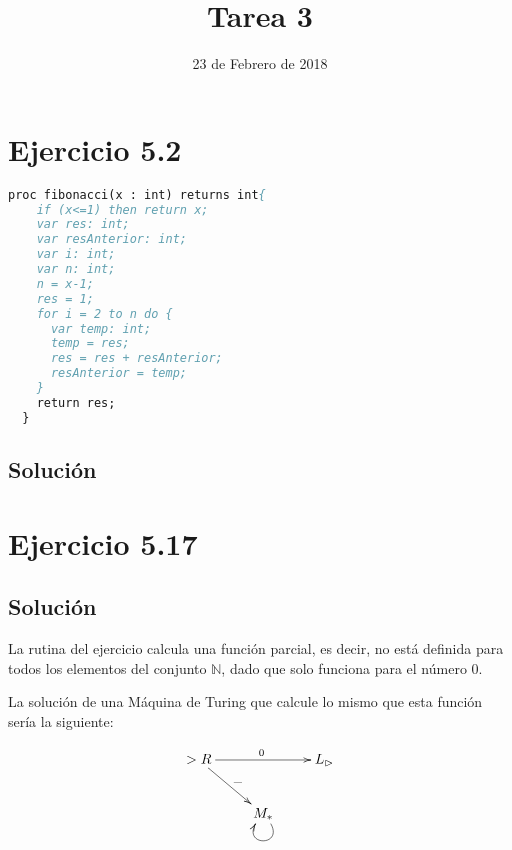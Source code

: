 \documentclass[11pt, a4paper, titlepage]{article}
\begin{document}
\title{Tarea 3}
\date{23 de Febrero de 2018}
\maketitle
\newpage



\section*{Ejercicio 5.2}

\begin{lstlisting}[language=pascal]
  proc fibonacci(x : int) returns int{
    if (x<=1) then return x;
    var res: int;
    var resAnterior: int;
    var i: int;
    var n: int;
    n = x-1;
    res = 1;
    for i = 2 to n do {
      var temp: int;
      temp = res;
      res = res + resAnterior;
      resAnterior = temp;
    }
    return res;
  }
\end{lstlisting}
\subsection*{Solución}

\section*{Ejercicio 5.17}
\subsection*{Solución}
La rutina del ejercicio calcula una función parcial, es decir, no está definida para todos
los elementos del conjunto $\mathbb{N}$, dado que solo funciona para el número 0.

La solución de una Máquina de Turing que calcule lo mismo que esta función sería la siguiente:

\[
\xymatrix{
  >R \ar[rr]^{0} \ar[dr]^{\_} && L_\rhd \\
  & M_* \ar@(dr,dl)
}
\]
\end{document}
